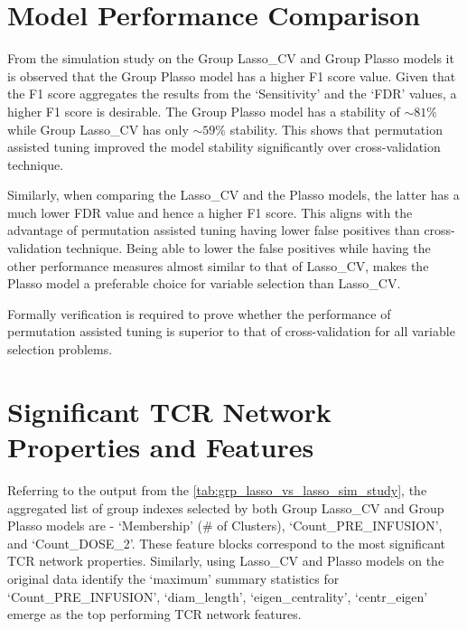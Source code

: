 \section{Model Performance Comparison} \label{sec:perf_measure}
From the simulation study on the Group Lasso\_CV and Group Plasso models it is observed that the Group Plasso model has a higher F1 score value. Given that the F1 score aggregates the results from the \lq Sensitivity' and the \lq FDR' values, a higher F1 score is desirable. The Group Plasso model has a stability of $\sim 81\%$ while Group Lasso\_CV has only $\sim 59\%$ stability. This shows that permutation assisted tuning improved the model stability significantly over cross-validation technique.\par
Similarly, when comparing the Lasso\_CV and the Plasso models, the latter has a much lower FDR value and hence a higher F1 score. This aligns with the advantage of permutation assisted tuning having lower false positives than cross-validation technique. Being able to lower the false positives while having the other performance measures almost similar to that of Lasso\_CV, makes the Plasso model a preferable choice for variable selection than Lasso\_CV.\par
Formally verification is required to prove whether the performance of permutation assisted tuning is superior to that of cross-validation for all variable selection problems.\par 

\section{Significant TCR Network Properties and Features} \label{sec:add_features}
Referring to the output from the \autoref{tab:grp_lasso_vs_lasso_sim_study}, the aggregated list of group indexes selected by both Group Lasso\_CV and Group Plasso models are - \lq Membership' (\# of Clusters), \lq Count\_PRE\_INFUSION', and \lq Count\_DOSE\_2'. These feature blocks correspond to the most significant TCR network properties. Similarly, using Lasso\_CV and Plasso models on the original data identify the \lq maximum' summary statistics for \lq Count\_PRE\_INFUSION', \lq diam\_length', \lq eigen\_centrality', \lq centr\_eigen' emerge as the top performing TCR network features.\par